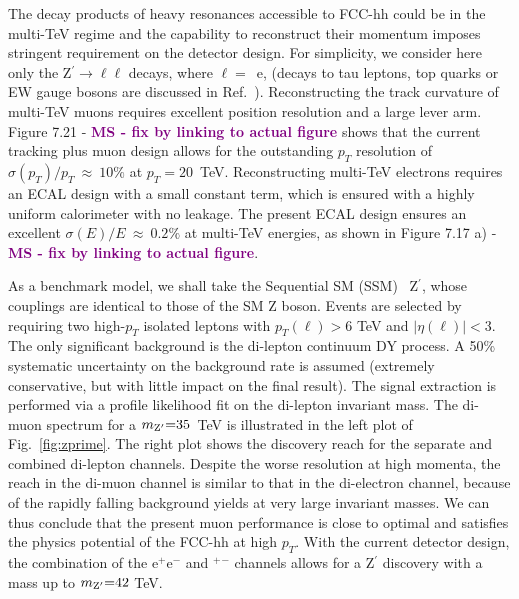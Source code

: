 \documentclass[11pt,twoside,a4paper]{cernrep}
\newcommand{\MS}[1]{\textbf{\textcolor{purple}{MS - #1}}}
\begin{document}
The decay products of heavy resonances accessible to FCC-hh could be in the multi-TeV regime and the capability to reconstruct their momentum imposes stringent requirement on the detector design. For simplicity, we consider here only the Z$^{\prime}\rightarrow \ell\ell$ decays, where $\ell=$~e, \textmu (decays to tau leptons, top quarks or EW gauge bosons are discussed in Ref.~\cite{Helsens:2642473}).
Reconstructing the track curvature of multi-TeV muons requires excellent position resolution and a large lever arm. Figure 7.21  - \MS{fix by linking to actual figure} shows that the current tracking plus muon design allows for the outstanding $p_T$ resolution of $\sigma(p_T)/p_T~\approx~10\%$ at $p_T=20$~TeV. Reconstructing multi-TeV electrons requires an ECAL design with a small constant term, which is ensured with a highly uniform calorimeter with no leakage. The present ECAL design ensures an excellent $\sigma(E)/E~\approx~0.2\%$ at multi-TeV energies, as shown in Figure 7.17 a) - \MS{fix by linking to actual figure}.

As a benchmark model, we shall take the Sequential SM (SSM)~\cite{Langacker:2008yv} Z$^{\prime}$, whose couplings are identical to those of the SM Z boson. Events are selected by requiring two high-$p_{T}$ isolated leptons with $p_T(\ell)>6$ TeV and $|\eta(\ell)|<3$. The only significant background is the di-lepton continuum DY process. A 50\% systematic uncertainty on the background rate is assumed (extremely conservative, but with little impact on the final result). The signal extraction is performed via a profile likelihood fit on the di-lepton invariant mass. The di-muon spectrum for a $m_{\rm Z^{\prime}} {=} 35$~TeV is illustrated in the left plot of Fig.~\ref{fig:zprime}. The right plot shows the discovery reach for the separate and combined di-lepton channels.
Despite the worse resolution at high momenta, the reach in the di-muon channel is similar to that in the di-electron channel, because of the rapidly falling background yields at very large invariant masses. We can thus conclude that the present muon performance is close to optimal and satisfies the physics potential of the FCC-hh at high $p_T$. With the current detector design, the combination of the e$^+$e$^-$ and \textmu$^+$\textmu$^-$ channels allows for a Z$^{\prime}$ discovery with a mass up to $m_{\rm Z^{\prime}} {=} 42$ TeV.
\end{document}
